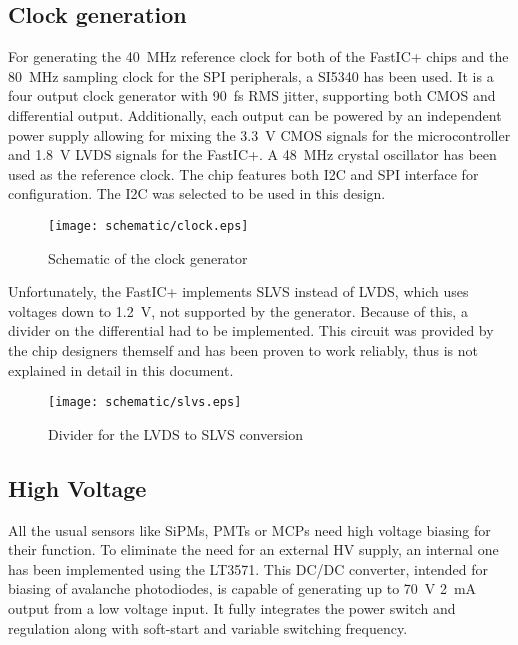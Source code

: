 \subsection{Clock generation}
For generating the \SI{40}{\mega\hertz} reference clock for both of the FastIC+ chips and the \SI{80}{\mega\hertz} sampling clock for the SPI peripherals, a SI5340 has been used. It is a four output clock generator with \SI{90}{\femto\second} RMS jitter, supporting both CMOS and differential output. Additionally, each output can be powered by an independent power supply allowing for mixing the \SI{3.3}{\volt} CMOS signals for the microcontroller and \SI{1.8}{\volt} LVDS signals for the FastIC+. A \SI{48}{\mega\hertz} crystal oscillator has been used as the reference clock. The chip features both I2C and SPI interface for configuration. The I2C was selected to be used in this design.
\FloatBarrier
\begin{figure}[htp!]
    \centering
    \texttt{[image: schematic/clock.eps]}
    \caption{Schematic of the clock generator}
    \label{fig:fastic_triggers}
\end{figure}
\FloatBarrier

Unfortunately, the FastIC+ implements SLVS instead of LVDS, which uses voltages down to \SI{1.2}{\volt}, not supported by the generator. Because of this, a divider on the differential had to be implemented. This circuit was provided by the chip designers themself and has been proven to work reliably, thus is not explained in detail in this document. 
\FloatBarrier
\begin{figure}[htp!]
    \centering
    \texttt{[image: schematic/slvs.eps]}
    \caption{Divider for the LVDS to SLVS conversion}
    \label{fig:fastic_triggers}
\end{figure}
\FloatBarrier

\subsection{High Voltage}
All the usual sensors like SiPMs, PMTs or MCPs need high voltage biasing for their function. To eliminate the need for an external HV supply, an internal one has been implemented using the LT3571. This DC/DC converter, intended for biasing of avalanche photodiodes, is capable of generating up to \SI{70}{\volt} \SI{2}{\milli\ampere} output from a low voltage input. It fully integrates the power switch and regulation along with soft-start and variable switching frequency. 

